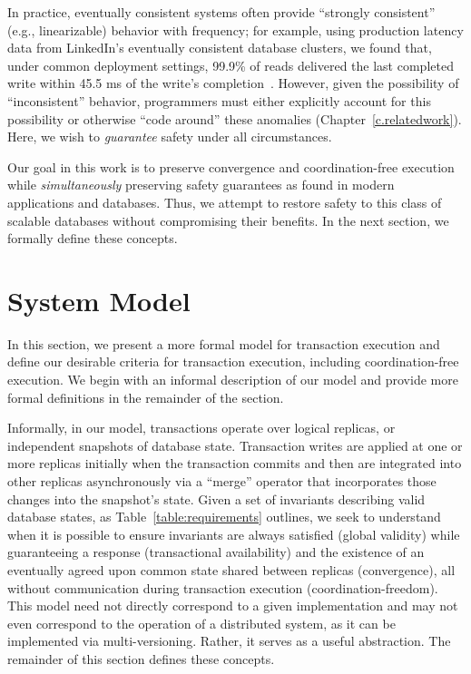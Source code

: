 In practice, eventually consistent systems often provide ``strongly
consistent'' (e.g., linearizable) behavior with frequency; for
example, using production latency data from LinkedIn's eventually
consistent database clusters, we found that, under common deployment
settings, 99.9\% of reads delivered the last completed write within
45.5 ms of the write's
completion~\cite{pbs,pbs-vldbj2013,pbs-demo-sigmod2013}. However,
given the possibility of ``inconsistent'' behavior, programmers must
either explicitly account for this possibility or otherwise ``code
around'' these anomalies (Chapter~\ref{c.relatedwork}). Here, we wish
to \textit{guarantee} safety under all circumstances.

Our goal in this work is to preserve convergence and coordination-free
execution while \textit{simultaneously} preserving safety guarantees
as found in modern applications and databases. Thus, we attempt to
restore safety to this class of scalable databases without compromising their
benefits. In the next section, we formally define these concepts.

\section{System Model}
\label{sec:model}

In this section, we present a more formal model for transaction
execution and define our desirable criteria for transaction execution,
including coordination-free execution. We begin with an informal
description of our model and provide more formal definitions in the
remainder of the section.

Informally, in our model, transactions operate over
logical replicas, or independent snapshots of database
state. Transaction writes are applied at one or more replicas
initially when the transaction commits and then are integrated into
other replicas asynchronously via a ``merge'' operator that
incorporates those changes into the snapshot's state. Given a set of
invariants describing valid database states, as
Table~\ref{table:requirements} outlines, we seek to understand when it
is possible to ensure invariants are always satisfied (global
validity) while guaranteeing a response (transactional availability)
and the existence of an eventually agreed upon common state shared
between replicas (convergence), all without communication during
transaction execution (coordination-freedom). This model need not
directly correspond to a given implementation and may not even
correspond to the operation of a distributed system, as it can be
implemented via multi-versioning. Rather, it serves as a useful
abstraction.  The remainder of this section defines these
concepts.

